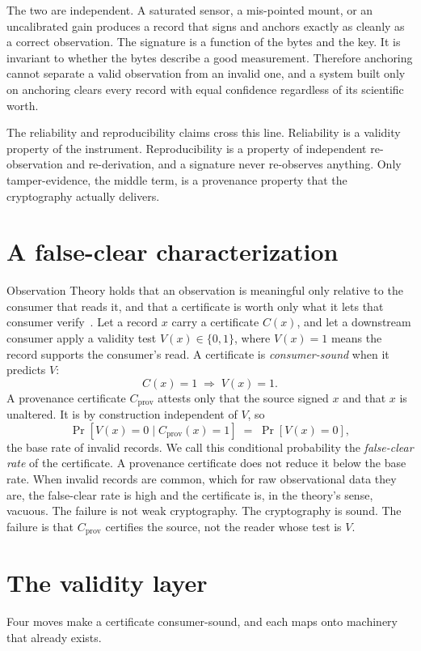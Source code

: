 \documentclass[conference]{IEEEtran}
\begin{document}
The two are independent. A saturated sensor, a mis-pointed mount, or an
uncalibrated gain produces a record that signs and anchors exactly as cleanly as
a correct observation. The signature is a function of the bytes and the key. It
is invariant to whether the bytes describe a good measurement. Therefore
anchoring cannot separate a valid observation from an invalid one, and a system
built only on anchoring clears every record with equal confidence regardless of
its scientific worth.

The reliability and reproducibility claims cross this line. Reliability is a
validity property of the instrument. Reproducibility is a property of independent
re-observation and re-derivation, and a signature never re-observes anything.
Only tamper-evidence, the middle term, is a provenance property that the
cryptography actually delivers.

\section{A false-clear characterization}\label{sec:falseclear}
Observation Theory holds that an observation is meaningful only relative to the
consumer that reads it, and that a certificate is worth only what it lets that
consumer verify~\cite{ot}. Let a record $x$ carry a certificate $C(x)$, and let a
downstream consumer apply a validity test $V(x)\in\{0,1\}$, where $V(x)=1$ means
the record supports the consumer's read. A certificate is \emph{consumer-sound}
when it predicts $V$:
\begin{equation}
  C(x)=1 \;\Rightarrow\; V(x)=1.
\end{equation}
A provenance certificate $C_{\mathrm{prov}}$ attests only that the source signed
$x$ and that $x$ is unaltered. It is by construction independent of $V$, so
\begin{equation}
  \Pr[V(x)=0 \mid C_{\mathrm{prov}}(x)=1] \;=\; \Pr[V(x)=0],
\end{equation}
the base rate of invalid records. We call this conditional probability the
\emph{false-clear rate} of the certificate. A provenance certificate does not
reduce it below the base rate. When invalid records are common, which for raw
observational data they are, the false-clear rate is high and the certificate is,
in the theory's sense, vacuous. The failure is not weak cryptography. The
cryptography is sound. The failure is that $C_{\mathrm{prov}}$ certifies the
source, not the reader whose test is $V$.

\section{The validity layer}\label{sec:layer}
Four moves make a certificate consumer-sound, and each maps onto machinery that
already exists.
\end{document}
